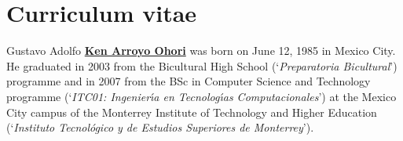 
\chapter{Curriculum vitae}

\noindent
Gustavo Adolfo \href{http://ken.mx}{\textbf{Ken Arroyo Ohori}} was born on June 12, 1985 in Mexico City.
He graduated in 2003 from the Bicultural High School (`\emph{Preparatoria Bicultural}') programme and in 2007 from the BSc in Computer Science and Technology programme (`\emph{ITC01: Ingenier\'\i{}a en Tecnolog\'\i{}as Computacionales}') at the Mexico City campus of the Monterrey Institute of Technology and Higher Education (`\emph{Instituto Tecnol\'ogico y de Estudios Superiores de Monterrey}').


